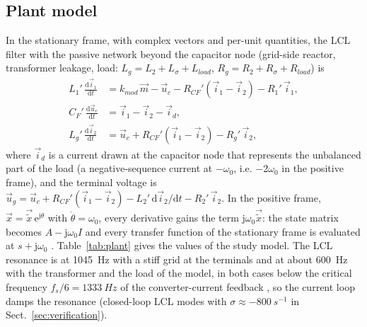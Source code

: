 \documentclass[10pt,a4paper]{scrartcl}
\newcommand{\wo}{\omega_0}
\newcommand{\kmod}{k_{mod}}
\newcommand{\jj}{\mathrm{j}}
\newcommand{\ee}{\mathrm{e}}
\newcommand{\dif}{\mathrm{d}}
\begin{document}
\begin{onehalfspace}
\subsection{Plant model}
\label{sec:plant}

In the stationary frame, with complex vectors and per-unit quantities, the LCL filter with the passive network beyond the capacitor node (grid-side reactor, transformer leakage, load: $L_g = L_2 + L_\sigma + L_{load}$, $R_g = R_2 + R_\sigma + R_{load}$) is
\begin{align}
L_1'\,\frac{\dif\vec i_1}{\dif t} &= \kmod\,\vec m - \vec u_c - R_{CF}'(\vec i_1 - \vec i_2) - R_1'\,\vec i_1, \nonumber\\
C_F'\,\frac{\dif\vec u_c}{\dif t} &= \vec i_1 - \vec i_2 - \vec i_d, \label{eq:plant}\\
L_g'\,\frac{\dif\vec i_2}{\dif t} &= \vec u_c + R_{CF}'(\vec i_1 - \vec i_2) - R_g'\,\vec i_2, \nonumber
\end{align}
where $\vec i_d$ is a current drawn at the capacitor node that represents the unbalanced part of the load (a negative-sequence current at $-\wo$, i.e. $-2\wo$ in the positive frame), and the terminal voltage is $\vec u_g = \vec u_c + R_{CF}'(\vec i_1 - \vec i_2) - L_2'\,\dif\vec i_2/\dif t - R_2'\,\vec i_2$. In the positive frame, $\vec x = \vec{\tilde x}\,\ee^{\jj\theta}$ with $\dot\theta = \wo$, every derivative gains the term $\jj\wo\vec{\tilde x}$: the state matrix becomes $A - \jj\wo I$ and every transfer function of the stationary frame is evaluated at $s + \jj\wo$ \cite{harnefors2007}. Table~\ref{tab:plant} gives the values of the study model. The LCL resonance is at \SI{1045}{Hz} with a stiff grid at the terminals and at about \SI{600}{Hz} with the transformer and the load of the model, in both cases below the critical frequency $f_s/6 = \SI{1333}{Hz}$ of the converter-current feedback \cite{parker2014}, so the current loop damps the resonance (closed-loop LCL modes with $\sigma \approx \SI{-800}{s^{-1}}$ in Sect.~\ref{sec:verification}).


\end{onehalfspace}
\end{document}
